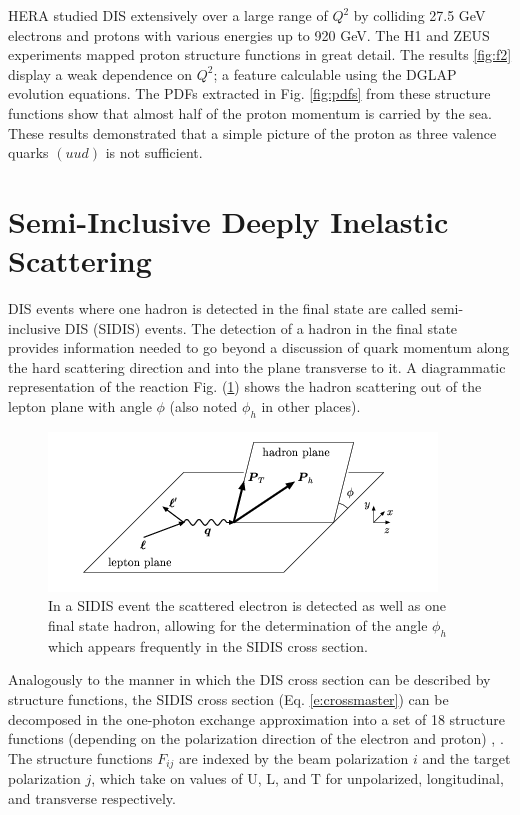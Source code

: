 HERA studied DIS extensively over a large range of $Q^2$ by colliding 27.5 GeV electrons and protons with various energies up to 920 GeV.  The H1 and ZEUS experiments mapped proton structure functions in great detail.  The results \ref{fig:f2} display a weak dependence on $Q^2$; a feature calculable using the DGLAP evolution equations.  The PDFs extracted in Fig. \ref{fig:pdfs} from these structure functions show that almost half of the proton momentum is carried by the sea.  These results demonstrated that a simple picture of the proton as three valence quarks $(uud)$ is not sufficient.    

\section{Semi-Inclusive Deeply Inelastic Scattering}
DIS events where one hadron is detected in the final state are called semi-inclusive DIS (SIDIS) events.  The detection of a hadron in the final state provides information needed to go beyond a discussion of quark momentum along the hard scattering direction and into the plane transverse to it.  A diagrammatic representation of the reaction Fig. (\ref{fig:sidis}) shows the hadron scattering out of the lepton plane with angle $\phi$ (also noted $\phi_h$ in other places).

\begin{figure}
	\centering
	\label{fig:sidis}
	\includegraphics[width = \textwidth]{image/diagrams/phi-hadron.png}	
	\caption[Diagrammatic representation of SIDIS with hadronic $\phi_h$ angle.]{In a SIDIS event the scattered electron is detected as well as one final state hadron, allowing for the determination of the angle $\phi_h$ which appears frequently in the SIDIS cross section.}
\end{figure}

Analogously to the manner in which the DIS cross section can be described by structure functions, the SIDIS cross section (Eq. \ref{e:crossmaster}) can be decomposed in the one-photon exchange approximation into a set of 18 structure functions (depending on the polarization direction of the electron and proton) \cite{tmds-mulders:1995}, \cite{tmds-bacchetta:2006}.  The structure functions $F_{ij}$ are indexed by the beam polarization $i$ and the target polarization $j$, which take on values of U, L, and T for unpolarized, longitudinal, and transverse respectively.

